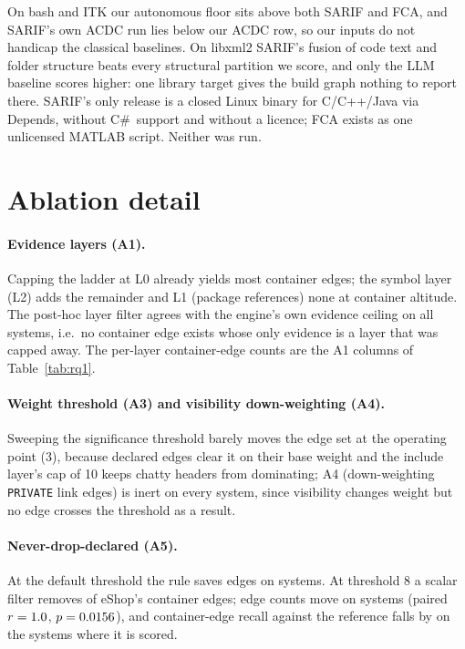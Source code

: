 \documentclass[10pt,conference]{IEEEtran}
\begin{document}
On bash and ITK our autonomous floor sits above both SARIF and FCA, and SARIF's own ACDC run lies
below our ACDC row, so our inputs do not handicap the classical baselines. On libxml2 SARIF's
fusion of code text and folder structure beats every structural partition we score, and only the
LLM baseline scores higher: one library target gives the build graph nothing to report there.
SARIF's only release is a closed Linux binary for C/C++/Java via Depends, without C\#\ support and
without a licence; FCA exists as one unlicensed MATLAB script. Neither was run.

\section{Ablation detail}
\label{sec:tr-ablation}

\paragraph{Evidence layers (A1).} Capping the ladder at L0 already yields most container edges;
the symbol layer (L2) adds the remainder and L1 (package references) none at container altitude.
The post-hoc layer filter agrees with the engine's own evidence ceiling on all
\rqThreeSevenSystemsChecked{} systems, i.e.\ no container edge exists whose only evidence is a
layer that was capped away. The per-layer container-edge counts are the A1 columns of
Table~\ref{tab:rq1}.

\paragraph{Weight threshold (A3) and visibility down-weighting (A4).} Sweeping the significance
threshold barely moves the edge set at the operating point (3), because declared edges clear it on
their base weight and the include layer's cap of 10 keeps chatty headers from dominating; A4
(down-weighting \texttt{PRIVATE} link edges) is inert on every system, since visibility changes
weight but no edge crosses the threshold as a result.

\paragraph{Never-drop-declared (A5).} At the default threshold the rule saves
\rqThreeAfiveOperatingEdgesSaved{} edges on \rqThreeAfiveOperatingSystemsChecked{} systems. At
threshold 8 a scalar filter removes \rqThreeAfiveEshopEdgesSaved{} of eShop's container edges;
edge counts move on \rqThreeAfiveWilcoxonN{} systems (paired $r=1.0{}$,
$p=0.0156{}$), and container-edge recall against the reference falls by
\rqThreeAfiveRefRecallDropList{} on the \rqThreeAfiveRefRecallSystems{} systems where it is scored.
\end{document}
